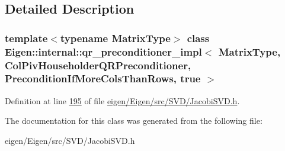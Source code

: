 \subsection{Detailed Description}
\subsubsection*{template$<$typename Matrix\+Type$>$\newline
class Eigen\+::internal\+::qr\+\_\+preconditioner\+\_\+impl$<$ Matrix\+Type, Col\+Piv\+Householder\+Q\+R\+Preconditioner, Precondition\+If\+More\+Cols\+Than\+Rows, true $>$}



Definition at line \hyperlink{eigen_2_eigen_2src_2_s_v_d_2_jacobi_s_v_d_8h_source_l00195}{195} of file \hyperlink{eigen_2_eigen_2src_2_s_v_d_2_jacobi_s_v_d_8h_source}{eigen/\+Eigen/src/\+S\+V\+D/\+Jacobi\+S\+V\+D.\+h}.



The documentation for this class was generated from the following file\+:\begin{DoxyCompactItemize}
\item 
eigen/\+Eigen/src/\+S\+V\+D/\+Jacobi\+S\+V\+D.\+h\end{DoxyCompactItemize}
